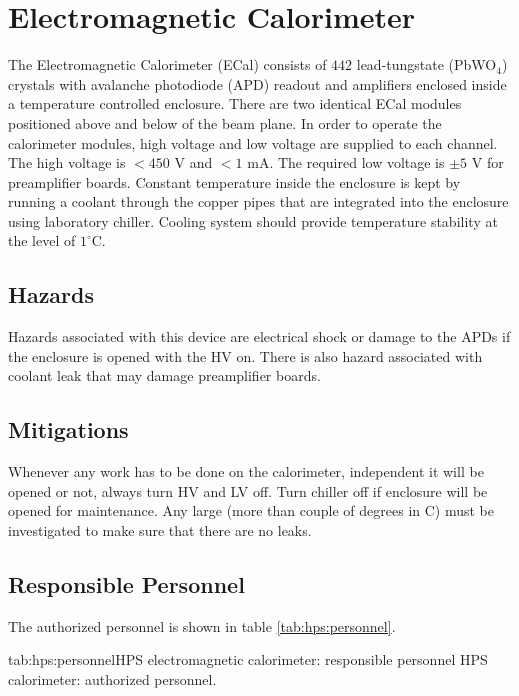 
\section{Electromagnetic Calorimeter}
\indent

The Electromagnetic Calorimeter (ECal) consists of $442$ lead-tungstate (PbWO$_4$) crystals with avalanche photodiode (APD) 
readout and amplifiers enclosed inside a temperature controlled enclosure. There are two identical ECal modules positioned above and below of the beam plane. In order to operate the calorimeter modules,  high voltage and low voltage are supplied to each channel. The high voltage is $<450$ V and $<1$ mA. The required low voltage is $\pm 5$ V for preamplifier boards. Constant temperature inside the enclosure is kept by running a coolant through the copper pipes that are integrated into the enclosure using laboratory chiller. Cooling system should provide temperature stability at the level of $1^\circ$C.

\subsection{Hazards} 
\indent

Hazards associated with this device are electrical shock or damage to the APDs if the enclosure is opened with the  HV on. There is also hazard associated with coolant leak that may damage preamplifier boards.

\subsection{Mitigations}
\indent

Whenever any work has to be done on the calorimeter, independent it will be opened or not, always turn HV and LV off. Turn chiller off if enclosure will be opened for maintenance. Any large (more than couple of degrees in C) must be investigated to make sure that there are no leaks.   



\begin{safetyen}{10}{15}
\subsection{Responsible  Personnel} 
\end{safetyen}
The authorized personnel is shown in table \ref{tab:hps:personnel}.
\begin{namestab}{tab:hps:personnel}{HPS  electromagnetic calorimeter: responsible personnel}{%
      HPS calorimeter: authorized personnel.}
\end{namestab}

